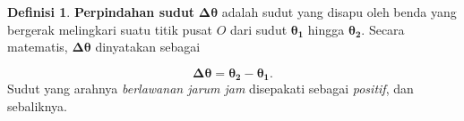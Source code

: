 \documentclass[12pt, a4paper]{article}\usepackage[utf8]{inputenc}
\theoremstyle{plain}
\theoremstyle{plain}
\numberwithin{equation}{section}
\theoremstyle{definition}
\newtheorem{defin}[teorema]{Definisi}
\begin{document}
	
	\begin{defin}
		\textbf{Perpindahan sudut} $\boldsymbol{\Delta \theta}$ adalah sudut yang disapu oleh benda yang bergerak melingkari suatu titik pusat $O$ dari sudut $\boldsymbol{\theta_{1}}$ hingga $\boldsymbol{\theta_{2}}$. Secara matematis, $\boldsymbol{\Delta \theta}$ dinyatakan sebagai
		
		\vspace{-.5em}
		\begin{equation*}
			\boldsymbol{\Delta \theta} = \boldsymbol{\theta_{2} - \theta_{1}}.
		\end{equation*}
		Sudut yang arahnya \textit{berlawanan jarum jam} disepakati sebagai \textit{positif}, dan sebaliknya.
	\end{defin}
	
	\pagebreak
	
\end{document}
